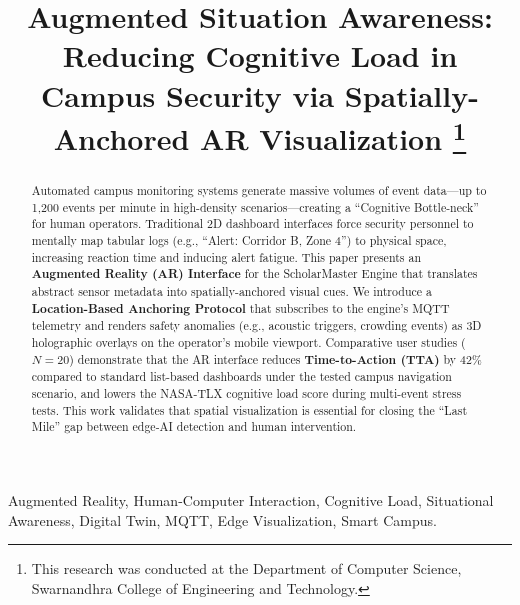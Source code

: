 \documentclass[conference]{IEEEtran}
\begin{document}
\title{Augmented Situation Awareness: Reducing Cognitive Load in Campus Security via Spatially-Anchored AR Visualization
\thanks{This research was conducted at the Department of Computer Science, Swarnandhra College of Engineering and Technology.}
}

\author{
}

\maketitle

\begin{abstract}
Automated campus monitoring systems generate massive volumes of event data---up to 1,200 events per minute in high-density scenarios---creating a ``Cognitive Bottle-neck'' for human operators. Traditional 2D dashboard interfaces force security personnel to mentally map tabular logs (e.g., ``Alert: Corridor B, Zone 4'') to physical space, increasing reaction time and inducing alert fatigue. This paper presents an \textbf{Augmented Reality (AR) Interface} for the ScholarMaster Engine that translates abstract sensor metadata into spatially-anchored visual cues. We introduce a \textbf{Location-Based Anchoring Protocol} that subscribes to the engine's MQTT telemetry and renders safety anomalies (e.g., acoustic triggers, crowding events) as 3D holographic overlays on the operator's mobile viewport. Comparative user studies ($N=20$) demonstrate that the AR interface reduces \textbf{Time-to-Action (TTA)} by 42\% compared to standard list-based dashboards under the tested campus navigation scenario, and lowers the NASA-TLX cognitive load score during multi-event stress tests. This work validates that spatial visualization is essential for closing the ``Last Mile'' gap between edge-AI detection and human intervention.
\end{abstract}

\begin{IEEEkeywords}
Augmented Reality, Human-Computer Interaction, Cognitive Load, Situational Awareness, Digital Twin, MQTT, Edge Visualization, Smart Campus.
\end{IEEEkeywords}
\end{document}
